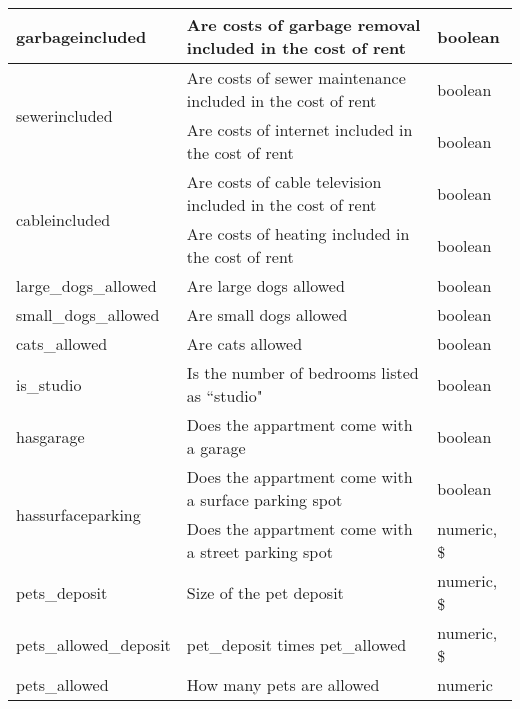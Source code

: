 \documentclass[12pt]{report}
\begin{document}
\begin{longtable}{|p{4cm}|p{8.7cm}|p{2.5cm}|}
	\multirow{2}{*}{garbageincluded}   & Are costs of garbage removal included in the cost of rent           & boolean          \\ \hline
	\multirow{2}{*}{sewerincluded}     & Are costs of sewer maintenance included in the cost of rent         & boolean          \\ \hline
	internetincluded                   & Are costs of internet included in the cost of rent                  & boolean          \\ \hline
	\multirow{2}{*}{cableincluded}     & Are costs of cable television included in the cost of rent          & boolean          \\ \hline
	heatingincluded                    & Are costs of heating included in the cost of rent                   & boolean          \\ \hline
	large\_dogs\_allowed               & Are large dogs allowed                                              & boolean          \\ \hline
	small\_dogs\_allowed               & Are small dogs allowed                                              & boolean          \\ \hline
	cats\_allowed                      & Are cats allowed                                                    & boolean          \\ \hline
	is\_studio                         & Is the number of bedrooms listed as ``studio"                       & boolean          \\ \hline
	hasgarage                          & Does the appartment come with a garage                              & boolean          \\ \hline
	\multirow{2}{*}{hassurfaceparking} & Does the appartment come with a surface parking spot                & boolean          \\ \hline
	hasstreetparking                   & Does the appartment come with a street parking spot                 & numeric, \$      \\ \hline
	pets\_deposit                      & Size of the pet deposit                                             & numeric, \$      \\ \hline
	pets\_allowed\_deposit             & pet\_deposit times pet\_allowed                                     & numeric, \$      \\ \hline
	pets\_allowed                      & How many pets are allowed                                           & numeric          \\ \hline

\end{longtable}
\end{document}
